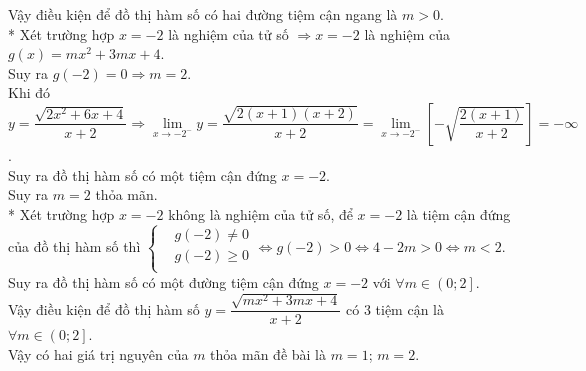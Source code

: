 \begin{ex}
{		Vậy điều kiện để đồ thị hàm số có hai đường tiệm cận ngang là $m>0$.\\
		* Xét trường hợp $x=-2$ là nghiệm của tử số $\Rightarrow x=-2$ là nghiệm của $g(x)=mx^2+3mx+4$.\\
		Suy ra $g\left(-2 \right)=0\Rightarrow m=2$.\\
		Khi đó $y=\dfrac{\sqrt{2x^2+6x+4}}{x+2}\Rightarrow \lim\limits_{x\to -{2^-}} y=\dfrac{\sqrt{2(x+1)(x+2)}}{x+2}=\lim\limits_{x\to -{2^-}} \left[ -\sqrt{\dfrac{2(x+1)}{x+2}} \right]=-\infty $.\\
		Suy ra đồ thị hàm số có một tiệm cận đứng $x=-2$.\\
		Suy ra $m=2$ thỏa mãn.\\
		* Xét trường hợp $x=-2$ không là nghiệm của tử số, để $x=-2$ là tiệm cận đứng của đồ thị hàm số thì $\left\{ \begin{aligned}
			& g(-2)\ne 0 \\
			& g(-2)\ge 0 \\
		\end{aligned} \right.\Leftrightarrow g(-2)>0\Leftrightarrow 4-2m>0\Leftrightarrow m<2$.\\
		Suy ra đồ thị hàm số có một đường tiệm cận đứng $x=-2$ với $\forall m\in \left(0;2 \right]$.\\
		Vậy điều kiện để đồ thị hàm số $y=\dfrac{\sqrt{mx^2+3mx+4}}{x+2}$ có $3$ tiệm cận là $\forall m\in \left(0;2 \right]$.\\
		Vậy có hai giá trị nguyên của $m$ thỏa mãn đề bài là $m=1$; $m=2$.}
\end{ex}

